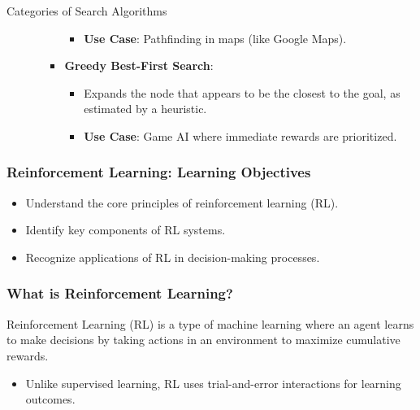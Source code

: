 \documentclass[aspectratio=169]{beamer}
\begin{document}
\begin{frame}[fragile]
\begin{block}{Categories of Search Algorithms}
\begin{enumerate}
\begin{itemize}
\begin{itemize}
                    \begin{itemize}
                        \item \textbf{Use Case}: Pathfinding in maps (like Google Maps).
                    \end{itemize}
                    \item \textbf{Greedy Best-First Search}: 
                    \begin{itemize}
                        \item Expands the node that appears to be the closest to the goal, as estimated by a heuristic.
                        \item \textbf{Use Case}: Game AI where immediate rewards are prioritized.
                    \end{itemize}
                \end{itemize}
            \end{itemize}
        \end{enumerate}
    \end{block}
\end{frame}

\begin{frame}[fragile]
    \frametitle{Reinforcement Learning: Learning Objectives}
    \begin{itemize}
        \item Understand the core principles of reinforcement learning (RL).
        \item Identify key components of RL systems.
        \item Recognize applications of RL in decision-making processes.
    \end{itemize}
\end{frame}

\begin{frame}[fragile]
    \frametitle{What is Reinforcement Learning?}
    Reinforcement Learning (RL) is a type of machine learning where an agent learns to make decisions by taking actions in an environment to maximize cumulative rewards. 
    \begin{itemize}
        \item Unlike supervised learning, RL uses trial-and-error interactions for learning outcomes.
    \end{itemize}
\end{frame}
\end{document}
